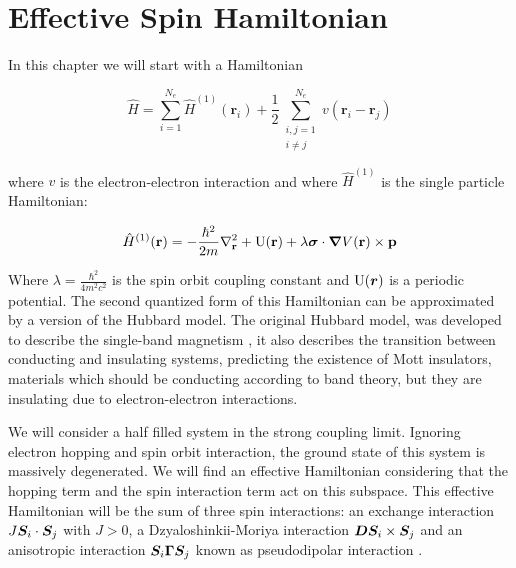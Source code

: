 \chapter{Effective Spin Hamiltonian}

In this chapter we will start with a Hamiltonian

\begin{equation}
\label{Ham1}
\hat{H} = \sum_{i=1}^{N_e} \hat{H}^{(1)}(\textbf{r}_i) + \frac{1}{2} \sum_{\substack{i,j = 1 \\ i \neq j}} ^ {N_e} v(\textbf{r}_i - \textbf{r}_j)
\end{equation}

where $v$ is the electron-electron interaction and where $\hat{H}^{(1)}$ is the single particle Hamiltonian:

\begin{equation}
\hat{H}^{(1)}(\textbf{r}) = -\frac{\hbar^2}{2m}\nabla^2_{\textbf{r}} + \text{U}(\textbf{r}) + \lambda\boldsymbol{\sigma}\cdot\boldsymbol{\nabla}V(\textbf{r}) \times \textbf{p}
\end{equation}

Where $\lambda = \frac{\hbar^2}{4m^2c^2}$ is the spin orbit coupling constant and $\text{U}(\boldsymbol{r})$ is a periodic potential. The second quantized form of this Hamiltonian can be approximated by a version of the Hubbard model. The original Hubbard model, was developed to describe the single-band magnetism \cite{Hubbard1963}, it also describes the transition between conducting and insulating systems, predicting the existence of Mott insulators, materials which should be conducting according to band theory, but they are insulating due to electron-electron interactions.

We will consider a half filled system in the strong coupling limit. Ignoring electron hopping and spin orbit interaction, the ground state of this system is massively degenerated. We will find an effective Hamiltonian considering that the hopping term and the spin interaction term act on this subspace. This effective Hamiltonian will be the sum of three spin interactions: an exchange interaction $J\boldsymbol{S}_i\cdot\boldsymbol{S}_j$ with $J>0$, a Dzyaloshinkii-Moriya interaction $\boldsymbol{D}\boldsymbol{S}_i\times\boldsymbol{S}_j$ and an anisotropic interaction $\boldsymbol{S}_i \boldsymbol{\Gamma} \boldsymbol{S}_j$ known as pseudodipolar interaction \cite{Moriya1960}.

